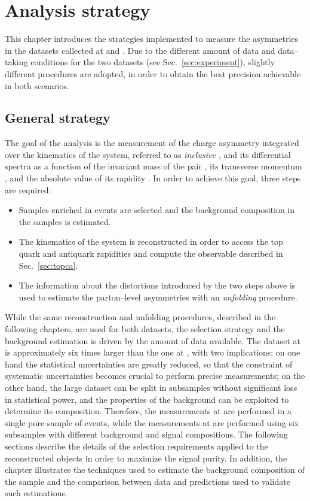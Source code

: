 \chapter{Analysis strategy}
\label{sec:strategy}

This chapter introduces the strategies implemented to measure the
asymmetries in the datasets collected at \seventev{} and \eighttev{}.
Due to the different amount of data and data--taking conditions for
the two datasets (see Sec.~\ref{sec:experiment}), slightly different
procedures are adopted, in order to obtain the best precision
achievable in both scenarios. 

\section{General strategy}

The goal of the analysis is the measurement of the charge asymmetry
\ac{} integrated over the kinematics of the \ttbar{} system,
referred to as {\it inclusive \ac{}}, and its differential spectra as
a function of the invariant mass of the \ttbar{} pair \mtt{}, its
transverse momentum \pttt{}, and the absolute value of its rapidity
\ytt{}. In order to achieve this goal, three steps are required:
\begin{itemize}
\item Samples enriched in \ttbar{} events are selected and the
  background composition in the samples is estimated.
\item The kinematics of the \ttbar{} system is reconstructed in order
  to access the top quark and antiquark rapidities and compute the
  \dy{} observable described in Sec.~\ref{sec:topca}.
\item The information about the distortions introduced by the two
  steps above is used to estimate the parton--level asymmetries with
  an {\it unfolding} procedure.
\end{itemize}

While the same reconstruction and unfolding procedures, described in
the following chapters, are used for both datasets, the selection
strategy and the background estimation is driven by the amount of data
available. 
The dataset at \eighttev{} is approximately six times larger than the
one at \seventev{}, with two implications: on one hand the statistical
uncertainties are greatly reduced, so that the constraint of
systematic uncertainties becomes crucial to perform precise
measurements; on the other hand, the large dataset can be split in
subsamples without significant loss in statistical power, and the
properties of the background can be exploited to determine
its composition. Therefore, the measurements at \seventev{} are
performed in a single pure sample of \ttbar{} events, while the
measurements at \eighttev{} are performed using six subsamples with
different background and signal compositions. The following sections
describe the details of the selection requirements applied to the
reconstructed objects in order to maximize the \ttbar{} signal
purity. 
In addition, the chapter illustrates the techniques used to estimate
the background composition of the sample and the comparison between
data and predictions used to validate such estimations.

